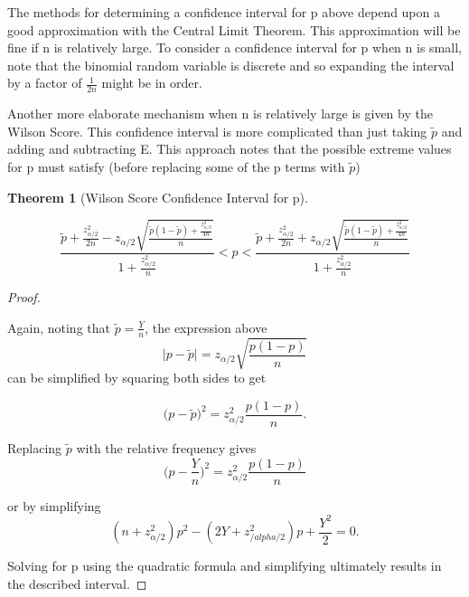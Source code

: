 \documentclass[10pt,]{book}
\theoremstyle{plain}
\newtheorem{theorem}{Theorem}[section]
\theoremstyle{definition}
\theoremstyle{definition}
\theoremstyle{definition}
\numberwithin{equation}{section}
\newcommand{\lt}{ < }
\begin{document}
The methods for determining a confidence interval for p above depend upon a good approximation with the Central Limit Theorem. This approximation will be fine if n is relatively large. To consider a confidence interval for p when n is small, note that the binomial random variable is discrete and so expanding the interval by a factor of \(\frac{1}{2n}\) might be in order.
%
\par

Another more elaborate mechanism when n is relatively large is given by the Wilson Score. This confidence interval is more complicated than just taking \(\tilde{p}\) and adding and subtracting E. This approach notes that the possible extreme values for p must satisfy (before replacing some of the p terms with \(\tilde{p}\))
\par


\begin{theorem}[{Wilson Score Confidence Interval for p}]\label{theorem-68}

\begin{equation*}\frac{\tilde{p} + \frac{z_{\alpha/2}^2}{2n} - z_{\alpha/2} \sqrt{\frac{\tilde{p}(1-\tilde{p}) + \frac{z_{\alpha/2}^2}{4n}}{n}}}{1 + \frac{z_{\alpha/2}^2}{n}} \lt p \lt \frac{\tilde{p} + \frac{z_{\alpha/2}^2}{2n} + z_{\alpha/2} \sqrt{\frac{\tilde{p}(1-\tilde{p}) + \frac{z_{\alpha/2}^2}{4n}}{n}}}{1 + \frac{z_{\alpha/2}^2}{n}}
\end{equation*}
%
\end{theorem}
\begin{proof}\hypertarget{proof-64}{}
Again, noting that \(\tilde{p} = \frac{Y}{n}\), the expression above
\begin{equation*} \big | p - \tilde{p} \big | = z_{\alpha /2} \sqrt{\frac{p(1-p)}{n}}\end{equation*}
can be simplified by squaring both sides to get

\begin{equation*} \big ( p - \tilde{p} \big )^2 = z_{\alpha /2}^2 \frac{p(1-p)}{n}.\end{equation*}

Replacing \(\tilde{p}\) with the relative frequency gives
\begin{equation*} \big ( p - \frac{Y}{n} \big )^2 = z_{\alpha /2}^2 \frac{p(1-p)}{n}\end{equation*}

or by simplifying
\begin{equation*}(n+z_{\alpha /2}^2 )p^2 - (2Y+z_{/alpha /2}^2) p + \frac{Y^2}{2} = 0.\end{equation*}

Solving for p using the quadratic formula and simplifying ultimately results in the described interval.
%
\end{proof}
\end{document}
